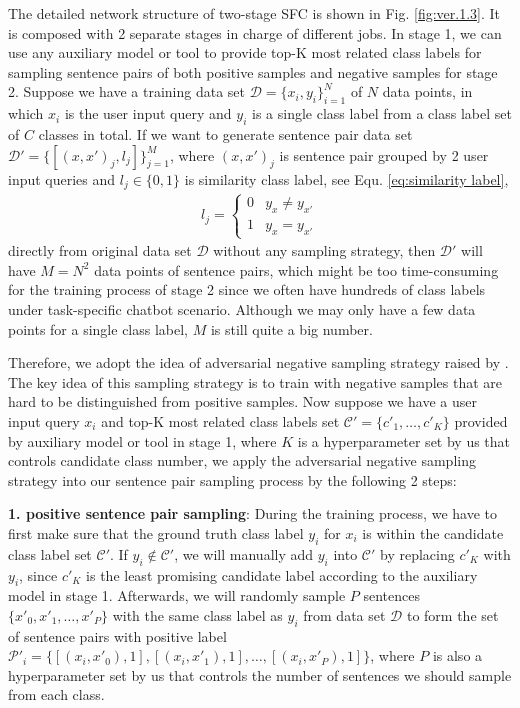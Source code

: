 \documentclass[letterpaper]{article} %
\begin{document}
  The   detailed   network   structure   of   two-stage   SFC  is  shown  in  Fig.
  \ref{fig:ver.1.3}.  It  is  composed  with  2  separate  stages  in  charge of
  different  jobs. In stage 1, we can use any auxiliary model or tool to provide
  top-K  most  related class labels for sampling sentence pairs of both positive
  samples  and negative samples for stage 2. Suppose we have a training data set
  $\mathcal{D}=\{x_{i},y_{i}\}_{i=1}^{N}$  of  $N$ data points, in which $x_{i}$
  is the user input query and $y_{i}$ is a single class label from a class label
  set  of  $C$  classes  in total. If we want to generate sentence pair data set
  $\mathcal{D'}=\{[(x,x')_{j},l_{j}]\}_{j=1}^{M}$,   where   $(x,   x')_{j}$  is
  sentence  pair  grouped  by  2  user  input  queries and $l_{j}\in\{0, 1\}$ is
  similarity class label, see Equ. \ref{eq:similarity label},
  \begin{align}
    l_{j}=
    \begin{cases} \label{eq:similarity label}
      0 & y_{x}\neq y_{x'}\\
      1 & y_{x}=y_{x'}
    \end{cases}
  \end{align}
  directly  from  original data set $\mathcal{D}$ without any sampling strategy,
  then  $\mathcal{D'}$  will  have  $M=N^2$ data points of sentence pairs, which
  might be too time-consuming for the training process of stage 2 since we often
  have  hundreds  of class labels under task-specific chatbot scenario. Although
  we  may  only  have  a  few data points for a single class label, $M$ is still
  quite a big number.

  Therefore,  we adopt the idea of adversarial negative sampling strategy raised
  by   \cite{bamler2020extreme}.  The  key  idea  of this sampling strategy is to
  train  with  negative  samples that are hard to be distinguished from positive
  samples. Now suppose we have a user input query $x_{i}$ and top-K most related
  class   labels   set  $\mathcal{C'}=\{c'_{1},  \dots,  c'_{K}\}$  provided  by
  auxiliary  model  or  tool in stage 1, where $K$ is a hyperparameter set by us
  that  controls  candidate  class  number,  we  apply  the adversarial negative
  sampling  strategy  into our sentence pair sampling process by the following 2
  steps:

  \textbf{1.  positive  sentence pair sampling}: During the training process, we
  have  to first make sure that the ground truth class label $y_{i}$ for $x_{i}$
  is  within  the  candidate  class  label  set  $\mathcal{C'}$. If $y_{i}\notin
  \mathcal{C'}$,  we  will manually add $y_{i}$ into $\mathcal{C'}$ by replacing
  $c'_{K}$  with  $y_{i}$, since $c'_{K}$ is the least promising candidate label
  according  to  the  auxiliary  model  in stage 1. Afterwards, we will randomly
  sample  $P$  sentences  $\{x'_{0},x'_{1}, \dots, x'_{P}\}$ with the same class
  label as $y_{i}$ from data set $\mathcal{D}$ to form the set of sentence pairs
  with   positive   label  $\mathcal{P'}_{i}=\{[(x_{i},  x'_{0}),  1],  [(x_{i},
  x'_{1}),   1],   \dots,   [(x_{i},   x'_{P}),  1]\}$,  where  $P$  is  also  a
  hyperparameter  set  by  us  that  controls  the number of sentences we should
  sample from each class.
\end{document}

